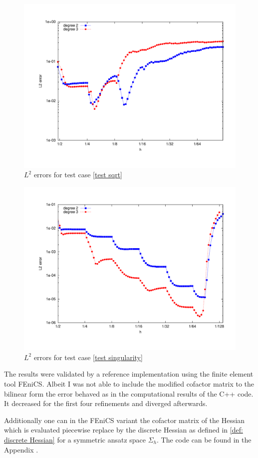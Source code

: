 \begin{figure}[H]
\centering
	\includegraphics[scale =0.4]{plots/MA3.pdf}
	\caption{$L^2$ errors for test case \ref{test sqrt}}
	\label{fig: l2 errors test sqrt ourMethod}
\end{figure}


\begin{figure}[H]
\centering
	\includegraphics[scale =0.4]{plots/MA2.pdf}
	\caption{$L^2$ errors for test case \ref{test singularity}}
	\label{fig: l2 errors test singularity ourMethod}
\end{figure}

The results were validated by a reference implementation using the finite element tool FEniCS. Albeit I was not able to include the modified cofactor matrix to the bilinear form the error behaved as in the computational results of the C++ code. It decreased for the first four refinements and diverged afterwards. 

Additionally one can in the FEniCS variant the cofactor matrix of the Hessian which is evaluated piecewise replace by the discrete Hessian as defined in \ref{def: discrete Hessian} for a symmetric ansatz space $\Sigma_h$. The code can be found in the Appendix .